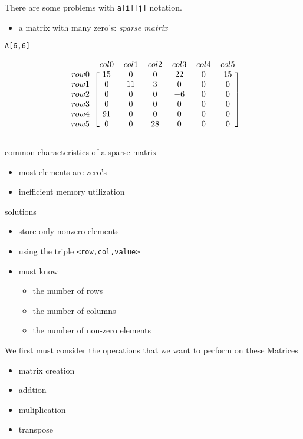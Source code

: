 \documentclass[newPxFont,sthlmFooter,nooffset]{beamer}
\begin{document}
\begin{frame}
\framebreak
There are some problems with \texttt{a[i][j]} notation.
\begin{itemize}
  \item a matrix with many zero's: \textit{sparse matrix}
\end{itemize}

\texttt{A[6,6]}

\begin{equation*}
  \begin{blockarray}{r *{6}{c}}
      & col0 & col1 & col2 & col3 & col4 & col5 \\
\begin{block}{l [*{6}{c}]}
 row0 & 15  & 0   & 0  &  22 &   0 &   15   \\
 row1 & 0   & 11  & 3  &   0 &   0 &   0   \\
 row2 & 0   & 0   & 0  &  -6 &   0 &   0   \\
 row3 & 0   & 0   & 0  &   0 &   0 &   0   \\
 row4 & 91  & 0   & 0  &   0 &   0 &   0   \\
 row5 & 0   & 0   & 28 &   0 &   0 &   0   \\
\end{block}
  \end{blockarray}
\end{equation*}

\framebreak

common characteristics of a sparse matrix
\begin{itemize}
\item most elements are zero's 
\item inefficient memory utilization
\end{itemize}
\bigskip

solutions
\begin{itemize}
\item store only nonzero elements
\item using the triple \texttt{<row,col,value>}
\item must know
  \begin{itemize}
  \item the number of rows
  \item the number of columns
  \item the number of non-zero elements
  \end{itemize}

\end{itemize}
\framebreak
We first must consider the operations that we want to perform on these Matrices
\begin{itemize}
  \item matrix creation
  \item addtion
  \item muliplication
  \item transpose
\end{itemize}


\end{frame}
\end{document}
